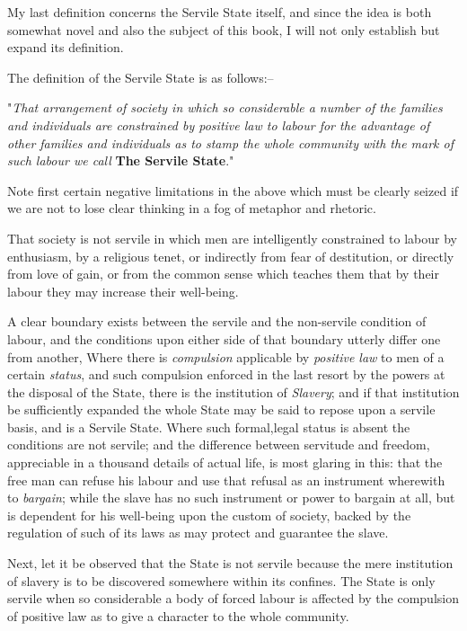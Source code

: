 \documentclass{book}
\begin{document}
My last definition concerns the Servile State itself, and since the idea is both somewhat novel and also the subject of this book, I will not only establish but expand its definition.

The definition of the Servile State is as follows:–

"\emph{That arrangement of society in which so considerable a number of the families and individuals are constrained by positive law to labour for the advantage of other families and individuals as to stamp the whole community with the mark of such labour we call} \textbf{The Servile State}."

Note first certain negative limitations in the above which must be clearly seized if we are not to lose clear thinking in a fog of metaphor and rhetoric.

That society is not servile in which men are intelligently constrained to labour by enthusiasm, by a religious tenet, or indirectly from fear of destitution, or directly from love of gain, or from the common sense which teaches them that by their labour they may increase their well-being.

A clear boundary exists between the servile and the non-servile condition of labour, and the conditions upon either side of that boundary utterly differ one from another, Where there is \emph{compulsion} applicable by \emph{positive law} to men of a certain \emph{status}, and such compulsion enforced in the last resort by the powers at the disposal of the State, there is the institution of \emph{Slavery}; and if that institution be sufficiently expanded the whole State may be said to repose upon a servile basis, and is a Servile State. Where such formal,legal status is absent the conditions are not servile; and the difference between servitude and freedom, appreciable in a thousand details of actual life, is most glaring in this: that the free man can refuse his labour and use that refusal as an instrument wherewith to \emph{bargain}; while the slave has no such instrument or power to bargain at all, but is dependent for his well-being upon the custom of society, backed by the regulation of such of its laws as may protect and guarantee the slave.

Next, let it be observed that the State is not servile because the mere institution of slavery is to be discovered somewhere within its confines. The State is only servile when so considerable a body of forced labour is affected by the compulsion of positive law as to give a character to the whole community.
\end{document}
